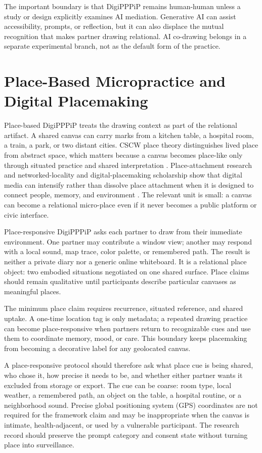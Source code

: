 \documentclass[
  english,
]{article}
\begin{document}
The important boundary is that DigiPPPiP remains human-human unless a
study or design explicitly examines AI mediation. Generative AI can
assist accessibility, prompts, or reflection, but it can also displace
the mutual recognition that makes partner drawing relational. AI
co-drawing belongs in a separate experimental branch, not as the default
form of the practice.

\newpage

\section{Place-Based Micropractice and Digital
Placemaking}\label{sec:place}

Place-based DigiPPPiP treats the drawing context as part of the
relational artifact. A shared canvas can carry marks from a kitchen
table, a hospital room, a train, a park, or two distant cities. CSCW
place theory distinguishes lived place from abstract space, which
matters because a canvas becomes place-like only through situated
practice and shared interpretation \citep{dourish2006respace}.
Place-attachment research and networked-locality and digital-placemaking
scholarship show that digital media can intensify rather than dissolve
place attachment when it is designed to connect people, memory, and
environment
\citep{lewicka2011place, gordon2011netlocality, foth2015digitalcity, canelas2025placemaking}.
The relevant unit is small: a canvas can become a relational micro-place
even if it never becomes a public platform or civic interface.

Place-responsive DigiPPPiP asks each partner to draw from their
immediate environment. One partner may contribute a window view; another
may respond with a local sound, map trace, color palette, or remembered
path. The result is neither a private diary nor a generic online
whiteboard. It is a relational place object: two embodied situations
negotiated on one shared surface. Place claims should remain qualitative
until participants describe particular canvases as meaningful places.

The minimum place claim requires recurrence, situated reference, and
shared uptake. A one-time location tag is only metadata; a repeated
drawing practice can become place-responsive when partners return to
recognizable cues and use them to coordinate memory, mood, or care. This
boundary keeps placemaking from becoming a decorative label for any
geolocated canvas.

A place-responsive protocol should therefore ask what place cue is being
shared, who chose it, how precise it needs to be, and whether either
partner wants it excluded from storage or export. The cue can be coarse:
room type, local weather, a remembered path, an object on the table, a
hospital routine, or a neighborhood sound. Precise global positioning
system (GPS) coordinates are not required for the framework claim and
may be inappropriate when the canvas is intimate, health-adjacent, or
used by a vulnerable participant. The research record should preserve
the prompt category and consent state without turning place into
surveillance.
\end{document}
